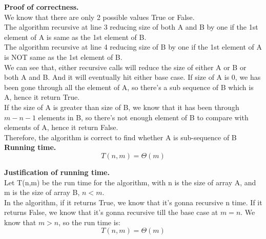 \documentclass[11pt]{article}
\begin{document}
\noindent
\textbf{Proof of correctness.}\\
We know that there are only 2 possible values True or False.\\
The algorithm recursive at line 3 reducing size of both A and B by one if the 1st element of A is same as the 1st element of B.\\
The algorithm recursive at line 4 reducing size of B by one if the 1st element of A is NOT same as the 1st element of B.\\
We can see that, either recursive calls will reduce the size of either A or B or both A and B. And it will eventually hit either base case. If size of A is 0, we has been gone through all the element of A, so there's a sub sequence of B which is A, hence it return True.\\
If the size of A is greater than size of B, we know that it has been through $m-n-1$ elements in B, so there's not enough element of B to compare with elements of A, hence it return False.\\
Therefore, the algorithm is correct to find whether A is sub-sequence of B\\
\noindent
\textbf{Running time.}
$$\boxed{T(n,m) = \Theta(m)}$$


\noindent
\textbf{Justification of running time.}\\
Let T(n,m) be the run time for the algorithm, with n is the size of array A, and m is the size of array B, $n < m$.\\
In the algorithm, if it returns True, we know that it's gonna recursive n time. If it returns False, we know that it's gonna recursive till the base case at $m = n$. We know that $m > n$, so the run time is:
$$\boxed{T(n,m) = \Theta(m)}$$

\newpage
\end{document}
